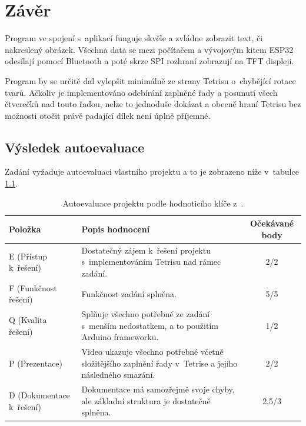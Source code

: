 \chapter{Závěr}

Program ve spojení s~aplikací \cite{AppPixelBluetoothCanvas} funguje skvěle a zvládne zobrazit text, či nakreslený obrázek. Všechna data se mezi počítačem a vývojovým kitem ESP32 odesílají pomocí Bluetooth a poté skrze SPI rozhraní zobrazují na TFT displeji.

Program by se určitě dal vylepšit minimálně ze strany Tetrisu o~chybějící rotace tvarů. Ačkoliv je implementováno odebírání zaplněné řady a posunutí všech čtverečků nad touto řadou, nelze to jednoduše dokázat a obecně hraní Tetrisu bez možnosti otočit právě padající dílek není úplně příjemné.

\section*{Výsledek autoevaluace}

Zadání vyžaduje autoevaluaci vlastního projektu a to je zobrazeno níže v~tabulce \ref{tab:autoevaluace}.

\begin{table}[h!]
    \centering
    \begin{tabular}{|l|p{62mm}|c|}
        \hline
        \textbf{Položka} & \textbf{Popis hodnocení} & \textbf{Očekávané body} \\
        \hline
        E (Přístup k~řešení)     & Dostatečný zájem k~řešení projektu s~implementováním Tetrisu nad rámec zadání. & 2/2 \\
        \hline
        F (Funkčnost řešení)     & Funkčnost zadání splněna. & 5/5 \\
        \hline
        Q (Kvalita řešení)       & Splňuje všechno potřebné ze zadání s~menším nedostatkem, a to použitím Arduino frameworku. & 1/2 \\
        \hline
        P (Prezentace)           & Video ukazuje všechno potřebné včetně složitějšího zaplnění řady v~Tetrise a jejího následného smazání. & 2/2 \\
        \hline
        D (Dokumentace k~řešení) & Dokumentace má samozřejmě svoje chyby, ale základní struktura je dostatečně splněna. & 2,5/3 \\
        \hline
    \end{tabular}
    \caption{Autoevaluace projektu podle hodnoticího klíče z~\cite{HodnoticiKlic}.}
    \label{tab:autoevaluace}
\end{table}
